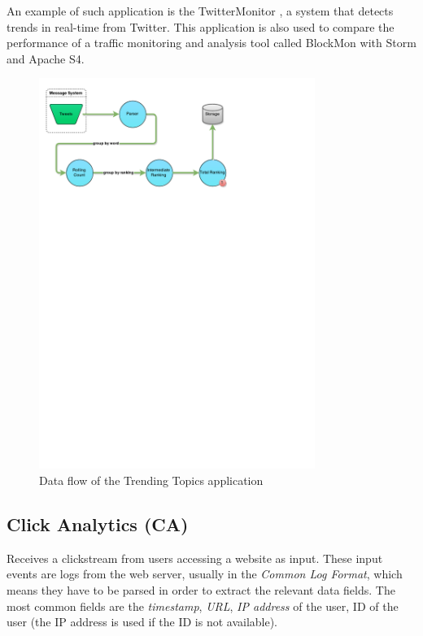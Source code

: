 \documentclass[ppgc,diss,english]{iiufrgs}
\begin{document}
An example of such application is the TwitterMonitor \cite{mathioudakis2010twittermonitor}, a system that detects trends in real-time from Twitter. This application is also used to compare the performance of a traffic monitoring and analysis tool called BlockMon \cite{simoncelli2013scaling} with Storm and Apache S4.

\begin{figure}[!ht]
	\centering
	\includegraphics[width=0.8\textwidth]{images/apps/TrendingTopics.pdf}
	\caption{Data flow of the Trending Topics application}
	\label{fig:app_trending_topics}
\end{figure}

\subsection{Click Analytics (CA)}

Receives a clickstream from users accessing a website as input. These input events are logs from the web server, usually in the \emph{Common Log Format}, which means they have to be parsed in order to extract the relevant data fields. The most common fields are the \emph{timestamp}, \emph{URL}, \emph{IP address} of the user, ID of the user (the IP address is used if the ID is not available).
\end{document}
